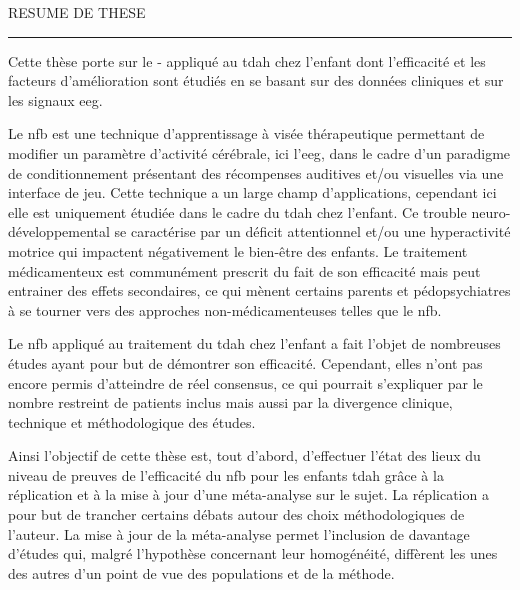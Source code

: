 
\begin{center}
\MakeUppercase{\LARGE{R}\Large{esume de these}} \\
\vspace{0mm}
\noindent\rule{16cm}{0.4pt}
\end{center}

Cette thèse porte sur le - appliqué au \gls{tdah} chez l'enfant dont l'efficacité et les 
facteurs d'amélioration sont étudiés en se basant sur des données cliniques et sur les signaux \gls{eeg}. 

Le \gls{nfb} est une technique d'apprentissage à visée thérapeutique permettant de modifier un paramètre d'activité cérébrale, 
ici l'\gls{eeg}, dans le cadre d'un paradigme de conditionnement présentant des récompenses auditives et/ou visuelles via une 
interface de jeu. Cette technique a un large champ d'applications, cependant ici elle est uniquement étudiée dans le cadre 
du \gls{tdah} chez l'enfant. Ce trouble neuro-développemental se caractérise par un déficit attentionnel et/ou une hyperactivité 
motrice qui impactent négativement le bien-être des enfants. Le traitement médicamenteux est communément prescrit du fait 
de son efficacité mais peut entrainer des effets secondaires, ce qui mènent certains parents et pédopsychiatres à se tourner 
vers des approches non-médicamenteuses telles que le \gls{nfb}.
 
Le \gls{nfb} appliqué au traitement du \gls{tdah} chez l'enfant a fait l'objet de nombreuses études ayant pour but de démontrer son efficacité. 
Cependant, elles n'ont pas encore permis d'atteindre de réel consensus, ce qui pourrait s'expliquer par le nombre restreint de patients inclus 
mais aussi par la divergence clinique, technique et méthodologique des études. 

Ainsi l'objectif de cette thèse est, tout d'abord, d'effectuer l'état des lieux du niveau de preuves de l'efficacité 
du \gls{nfb} pour les enfants \gls{tdah} grâce à la réplication et à la mise à jour d'une méta-analyse sur le sujet. 
La réplication a pour but de trancher certains débats autour des choix méthodologiques de l'auteur. 
La mise à jour de la méta-analyse permet l'inclusion de davantage d'études qui, malgré l'hypothèse concernant leur homogénéité,
diffèrent les unes des autres d'un point de vue des populations et de la méthode.  

